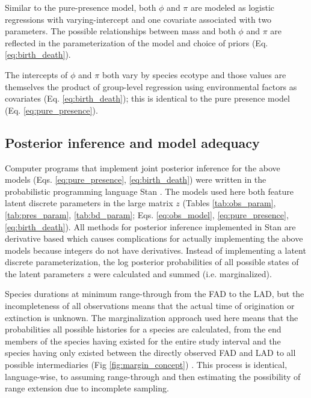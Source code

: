 \documentclass[12pt,letterpaper]{article}
\begin{document}
Similar to the pure-presence model, both \(\phi\) and \(\pi\) are modeled as logistic regressions with varying-intercept and one covariate associated with two parameters. The possible relationships between mass and both \(\phi\) and \(\pi\) are reflected in the parameterization of the model and choice of priors (Eq. \ref{eq:birth_death}).

The intercepts of \(\phi\) and \(\pi\) both vary by species ecotype and those values are themselves the product of group-level regression using environmental factors as covariates (Eq. \ref{eq:birth_death}); this is identical to the pure presence model (Eq. \ref{eq:pure_presence}).


\subsection*{Posterior inference and model adequacy}
Computer programs that implement joint posterior inference for the above models (Eqs. \ref{eq:pure_presence}, \ref{eq:birth_death}) were written in the probabilistic programming language Stan \citep{StanDevelopmentTeam2016}. The models used here both feature latent discrete parameters in the large matrix \(z\) (Tables \ref{tab:obs_param}, \ref{tab:pres_param}, \ref{tab:bd_param}; Eqs. \ref{eq:obs_model}, \ref{eq:pure_presence}, \ref{eq:birth_death}). All methods for posterior inference implemented in Stan are derivative based which causes complications for actually implementing the above models because integers do not have derivatives. Instead of implementing a latent discrete parameterization, the log posterior probabilities of all possible states of the latent parameters \(z\) were calculated and summed (i.e. marginalized). 

Species durations at minimum range-through from the FAD to the LAD, but the incompleteness of all observations means that the actual time of origination or extinction is unknown. The marginalization approach used here means that the probabilities all possible histories for a species are calculated, from the end members of the species having existed for the entire study interval and the species having only existed between the directly observed FAD and LAD to all possible intermediaries (Fig \ref{fig:margin_concept}) \citep{StanDevelopmentTeam2016}. This process is identical, language-wise, to assuming range-through and then estimating the possibility of range extension due to incomplete sampling. %
\end{document}
